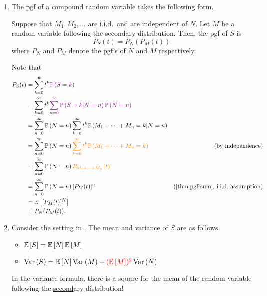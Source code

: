 \begin{enumerate}
\item \label{it:cpd-pgf} The pgf of a compound random variable takes the
following form.

Suppose that \(M_1,M_2,\dotsc\) are i.i.d.\ and are independent of \(N\).  Let
\(M\) be a random variable following the secondary distribution.  Then, the pgf
of \(S\) is
\[
P_S(t)=P_N(P_M(t))
\]
where \(P_N\) and \(P_M\) denote the pgf's of \(N\) and \(M\) respectively.

\begin{pf}
Note that
\begin{align*}
P_S(t)&=\sum_{k=0}^{\infty}t^k{\color{violet}\prob{S=k}}\\
&=\sum_{k=0}^{\infty}t^k{\color{violet}\sum_{n=0}^{\infty}\prob{S=k|N=n}\prob{N=n}}\\
&=\sum_{n=0}^{\infty}\prob{N=n}\sum_{k=0}^{\infty}t^k\prob{M_1+\dotsb+M_n=k|N=n}\\
&=\sum_{n=0}^{\infty}\prob{N=n}{\color{orange}\sum_{k=0}^{\infty}t^k\prob{M_1+\dotsb+M_n=k}}&\text{(by independence)}\\
&=\sum_{n=0}^{\infty}\prob{N=n}{\color{orange}P_{M_1+\dotsb+M_n}(t)}\\
&=\sum_{n=0}^{\infty}\prob{N=n}[P_{M}(t)]^n&\text{(\Cref{thm:pgf-sum}, i.i.d.\ assumption)}\\
&=\expv{[P_M(t)]^N}\\
&=P_N(P_M(t)).
\end{align*}
\end{pf}

\item \label{it:cpd-dist-mean-var}
Consider the setting in . The mean and variance of \(S\)
are as follows.
\begin{itemize}
\item \(\mathbb{E}\left[S\right]=\mathbb{E}\left[N\right]\mathbb{E}\left[M\right]\)
\item \(\operatorname{Var}\left(S\right)=\mathbb{E}\left[N\right]\operatorname{Var}\left(M\right)+{\color{red}(\mathbb{E}\left[M\right])^2}\operatorname{Var}\left(N\right)\)
\end{itemize}
\begin{warning}
In the variance formula, there is a square for the mean of the random variable
following the \underline{second}ary distribution!
\end{warning}


\end{enumerate}
